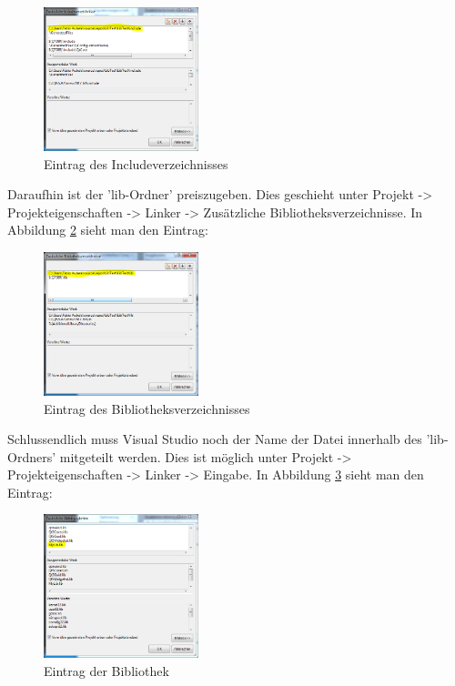 \begin{figure}[H]
	\centering
	\includegraphics[width=0.40\textwidth]{figures/vsInclude.png}
	\caption{Eintrag des Includeverzeichnisses}
	\label{fig:inc}
\end{figure}
Daraufhin ist der 'lib-Ordner' preiszugeben. Dies geschieht unter Projekt -> Projekteigenschaften -> Linker -> Zusätzliche Bibliotheksverzeichnisse. In Abbildung \ref{fig:bibV} sieht man den Eintrag:
\begin{figure}[H]
	\centering
	\includegraphics[width=0.40\textwidth]{figures/vsBib.png}
	\caption{Eintrag des Bibliotheksverzeichnisses}
	\label{fig:bibV}
\end{figure}
Schlussendlich muss Visual Studio noch der Name der Datei innerhalb des 'lib-Ordners' mitgeteilt werden. Dies ist möglich unter Projekt -> Projekteigenschaften -> Linker -> Eingabe. In Abbildung \ref{fig:bibV2} sieht man den Eintrag:
\begin{figure}[H]
	\centering
	\includegraphics[width=0.40\textwidth]{figures/vsBib2.png}
	\caption{Eintrag der Bibliothek}
	\label{fig:bibV2}
\end{figure}
